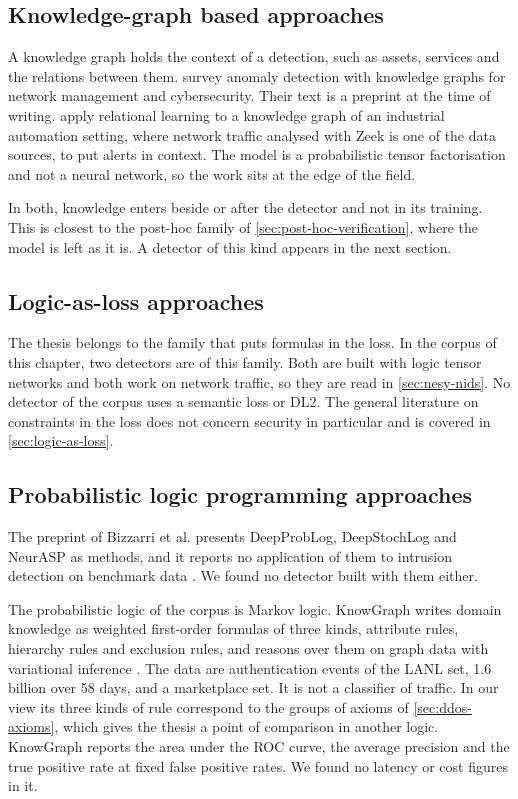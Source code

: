 \subsection{Knowledge-graph based approaches}
\label{sec:nesy-kg}

A knowledge graph holds the context of a detection, such as assets, services and
the relations between them. \citet{tailhardat2025anomaly} survey anomaly
detection with knowledge graphs for network management and cybersecurity. Their
text is a preprint at the time of writing.
\citet{garrido2021knowledge} apply relational learning to a knowledge graph of
an industrial automation setting, where network traffic analysed with Zeek is
one of the data sources, to put alerts in context. The model is a probabilistic
tensor factorisation and not a neural network, so the work sits at the edge of
the field.

In both, knowledge enters beside or after the detector and not in its training.
This is closest to the post-hoc family of \cref{sec:post-hoc-verification}, where
the model is left as it is. A detector of this kind appears in the next section.

\subsection{Logic-as-loss approaches}
\label{sec:nesy-logic-loss}

The thesis belongs to the family that puts formulas in the loss. In the corpus
of this chapter, two detectors are of this family. Both are built with logic
tensor networks and both work on network traffic, so they are read in
\cref{sec:nesy-nids}. No detector of the corpus uses a semantic loss or DL2. The
general literature on constraints in the loss does not concern security in
particular and is covered in \cref{sec:logic-as-loss}.

\subsection{Probabilistic logic programming approaches}
\label{sec:nesy-plp}

The preprint of Bizzarri et al. presents DeepProbLog, DeepStochLog and NeurASP
as methods, and it reports no application of them to intrusion detection on
benchmark data \citep{bizzarri2024synergistic}. We found no detector built with
them either.

The probabilistic logic of the corpus is Markov logic. KnowGraph writes domain
knowledge as weighted first-order formulas of three kinds, attribute rules,
hierarchy rules and exclusion rules, and reasons over them on graph data with
variational inference \citep{zhou2024knowgraph}. The data are authentication
events of the LANL set, 1.6 billion over 58 days, and a marketplace set. It is
not a classifier of traffic. In our view its three kinds of rule correspond to
the groups of axioms of \cref{sec:ddos-axioms}, which gives the thesis a point
of comparison in another logic. KnowGraph reports the area under the ROC curve, the average
precision and the true positive rate at fixed false positive rates. We found no
latency or cost figures in it.

